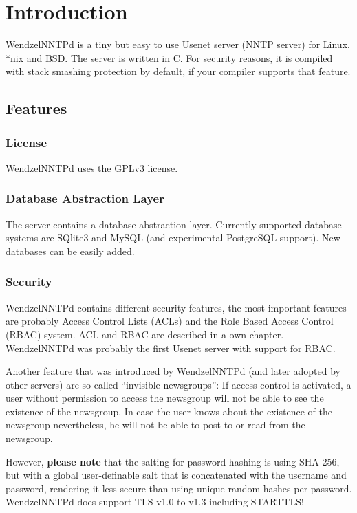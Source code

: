 \chapter{Introduction}

WendzelNNTPd is a tiny but easy to use Usenet server (NNTP server) for Linux, *nix and BSD. The server is written in C. For security reasons, it is compiled with stack smashing protection by default, if your compiler supports that feature.

\section{Features}

\subsection{License}

WendzelNNTPd uses the GPLv3 license.

\subsection{Database Abstraction Layer}

The server contains a database abstraction layer. Currently supported database systems are SQlite3 and MySQL (and experimental PostgreSQL support). New databases can be easily added.

\subsection{Security}

WendzelNNTPd contains different security features, the most important features are probably Access Control Lists (ACLs) and the Role Based Access Control (RBAC) system. ACL and RBAC are described in a own chapter. WendzelNNTPd was probably the first Usenet server with support for RBAC.

Another feature that was introduced by WendzelNNTPd (and later adopted by other servers) are so-called ``invisible newsgroups'': If access control is activated, a user without permission to access the newsgroup will not be able to see the existence of the newsgroup. In case the user knows about the existence of the newsgroup nevertheless, he will not be able to post to or read from the newsgroup.

However, \textbf{please note} that the salting for password hashing is using SHA-256, but with a global user-definable salt that is concatenated with the username and password, rendering it less secure than using unique random hashes per password. 
%
WendzelNNTPd does support TLS v1.0 to v1.3 including STARTTLS!

